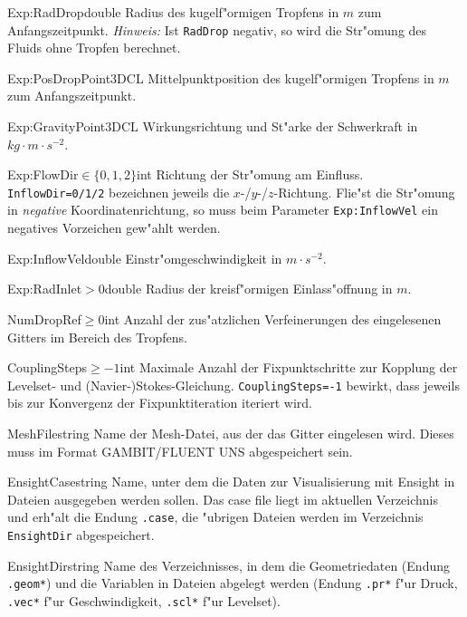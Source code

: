 %
\begin{Desc}
{Exp:RadDrop}{}{double}
Radius des kugelf"ormigen Tropfens in $m$ zum Anfangszeitpunkt. \emph{Hinweis:} 
Ist \verb|RadDrop| negativ, so wird die Str"omung des Fluids ohne Tropfen 
berechnet.
\end{Desc}
%
\begin{Desc}
{Exp:PosDrop}{}{Point3DCL}
Mittelpunktposition des kugelf"ormigen Tropfens in $m$ zum Anfangszeitpunkt.
\end{Desc}
%
\begin{Desc}
{Exp:Gravity}{}{Point3DCL}
Wirkungsrichtung und St"arke der Schwerkraft in $kg\cdot m\cdot s^{-2}$.
\end{Desc}
%
\begin{Desc}
{Exp:FlowDir}{$\in\{0,1,2\}$}{int}
Richtung der Str"omung am Einfluss. \verb|InflowDir=0/1/2| bezeichnen
jeweils die $x$-/$y$-/$z$-Richtung. Flie"st die Str"omung in \emph{negative} 
Koordinatenrichtung, so muss beim Parameter \verb|Exp:InflowVel| ein 
negatives Vorzeichen gew"ahlt werden.
\end{Desc}
%
\begin{Desc}
{Exp:InflowVel}{}{double}
Einstr"omgeschwindigkeit in $m\cdot s^{-2}$.
\end{Desc}
%
\begin{Desc}
{Exp:RadInlet}{$>0$}{double}
Radius der kreisf"ormigen Einlass"offnung in $m$.
\end{Desc}

%
\begin{Desc}
{NumDropRef}{$\geq0$}{int}
Anzahl der zus"atzlichen Verfeinerungen des eingelesenen Gitters im Bereich des
Tropfens.
\end{Desc}
%
\begin{Desc}
{CouplingSteps}{$\geq-1$}{int}
Maximale Anzahl der Fixpunktschritte zur Kopplung der Levelset- und
(Navier-)Stokes-Gleichung. \verb|CouplingSteps=-1| bewirkt, dass jeweils bis zur
Konvergenz der Fixpunktiteration iteriert wird.
\end{Desc}
%
\begin{Desc}
{MeshFile}{}{string}
Name der Mesh-Datei, aus der das Gitter eingelesen wird. Dieses muss im
Format GAMBIT/FLUENT UNS abgespeichert sein.
\end{Desc}
%
\begin{Desc}
{EnsightCase}{}{string}
Name, unter dem die Daten zur Visualisierung mit Ensight in Dateien ausgegeben 
werden sollen. Das case file liegt im aktuellen Verzeichnis und erh"alt die 
Endung \verb|.case|, die "ubrigen Dateien werden im Verzeichnis
\verb|EnsightDir| abgespeichert.
\end{Desc}
%
\begin{Desc}
{EnsightDir}{}{string}
Name des Verzeichnisses, in dem die Geometriedaten (Endung \verb|.geom*|) und 
die Variablen in Dateien abgelegt werden (Endung \verb|.pr*| f"ur Druck, 
\verb|.vec*| f"ur Geschwindigkeit, \verb|.scl*| f"ur Levelset).
\end{Desc}


